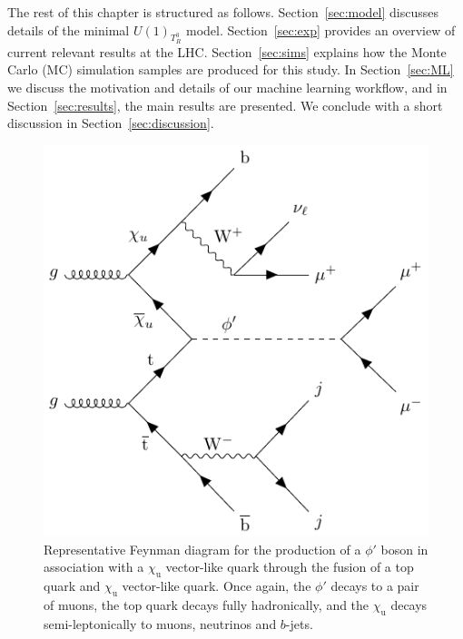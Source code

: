 The rest of this chapter is structured as follows. Section~\ref{sec:model} discusses details of the minimal  $U(1)_{T_R^3}$ model. Section~\ref{sec:exp} provides an overview of current relevant results at the LHC. Section~\ref{sec:sims} explains how the Monte
Carlo (MC) simulation samples are produced for this study. In Section~\ref{sec:ML} we discuss the motivation and details of our machine learning workflow, and in Section~\ref{sec:results}, the main results are presented. We conclude with a short discussion in Section~\ref{sec:discussion}.
\begin{figure}
    \centering
    \includegraphics[width=0.75\linewidth]{Images/signal_qqfusion.pdf}
    \caption{Representative Feynman diagram for the production of a $\phi'$ boson in association with a $\chi_\mathrm{u}$ vector-like quark through the fusion of a top quark and $\chi_\mathrm{u}$ vector-like quark. Once again, the $\phi'$ decays to a pair of muons, the top quark decays fully hadronically, and the $\chi_\mathrm{u}$ decays semi-leptonically to muons, neutrinos and $b$-jets.\label{fig:qqfusion}}
\end{figure}

